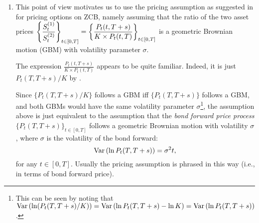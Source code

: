 \begin{enumerate}

\item This point of view motivates us to use the pricing assumption as
suggested in  for pricing options on ZCB, namely
assuming that the ratio of the two asset prices \(\displaystyle
\qty{\frac{S_t^{(1)}}{S_t^{(2)}}}_{t\in[0,T]}=\qty{\frac{P_t(t,T+s)}{K\times P_t(t,T)}}_{t\in[0,T]}\) is a
geometric Brownian motion (GBM) with volatility parameter \(\sigma\).

The expression \(\displaystyle \frac{P_t(t,T+s)}{K\times P_t(t,T)}\) appears to be quite
familiar. Indeed, it is just \(P_t(T,T+s)/K\) by
.

Since \(\{P_t(T,T+s)/K\}\) follows a GBM iff \(\{P_t(T,T+s)\}\) follows a GBM,
and both GBMs would have the same volatility parameter \(\sigma\)\footnote{This
can be seen by noting that \(\operatorname{Var}\qty(\ln(P_t(T,T+s)/K))=\operatorname{Var}\qty(\ln P_t(T,T+s)-\ln
K)=\operatorname{Var}\qty(\ln P_t(T,T+s))\).}, the assumption above is just equivalent to the
assumption that the \emph{bond forward price process}
\(\{P_t(T,T+s)\}_{t\in[0,T]}\) follows a geometric Brownian motion with
volatility \(\sigma\), where \(\sigma\) is the volatility of the bond forward:
\[
\operatorname{Var}\qty(\ln P_t(T,T+s))=\sigma^2 t,
\]
for any \(t\in[0,T]\). Usually the pricing assumption is phrased in this way
(i.e., in terms of bond forward price).


\end{enumerate}
